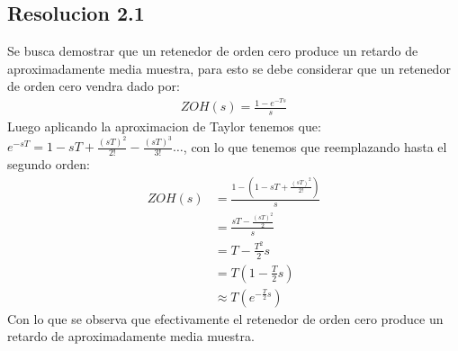 \documentclass[
  11pt,
  letterpaper,
   addpoints,
  ]{exam}
\begin{document}
\begin{questions}
\begin{solution}
\subsection*{Resolucion 2.1}
Se busca demostrar que un retenedor de orden cero produce un retardo de aproximadamente media muestra, para esto se debe considerar que un retenedor de orden cero vendra dado por:
\begin{align}
    ZOH(s)= \frac{1-e^{-Ts}}{s}
\end{align}
Luego aplicando la aproximacion de Taylor tenemos que: $e^{-sT}= 1 - sT + \frac{(sT)^{2}}{2!} - \frac{(sT)^{3}}{3!} \ldots $, con lo que tenemos que reemplazando hasta el segundo orden:
\begin{align}
    ZOH(s) &= \frac{1-(1-sT + \frac{(sT)^{2}}{2!})}{s}\\
    &= \frac{sT - \frac{(sT)^{2}}{2}}{s}\\
    &= T - \frac{T^{2}}{2}s\\
    &= T(1- \frac{T}{2}s)\\
    &\approx T(e^{-\frac{T}{2}s})
\end{align}
Con lo que se observa que efectivamente el retenedor de orden cero produce un retardo de aproximadamente media muestra.

\end{solution}
\end{questions}
\end{document}
